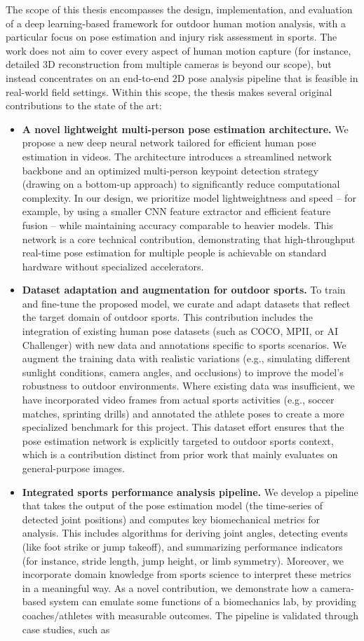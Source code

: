The scope of this thesis encompasses the design, implementation, and evaluation of a deep learning-based framework for outdoor human motion analysis, with a particular focus on pose estimation and injury risk assessment in sports. The work does not aim to cover every aspect of human motion capture (for instance, detailed 3D reconstruction from multiple cameras is beyond our scope), but instead concentrates on an end-to-end 2D pose analysis pipeline that is feasible in real-world field settings. Within this scope, the thesis makes several original contributions to the state of the art: \begin{itemize}
\item \textbf{A novel lightweight multi-person pose estimation architecture.} We propose a new deep neural network tailored for efficient human pose estimation in videos. The architecture introduces a streamlined network backbone and an optimized multi-person keypoint detection strategy (drawing on a bottom-up approach) to significantly reduce computational complexity. In our design, we prioritize model lightweightness and speed – for example, by using a smaller CNN feature extractor and efficient feature fusion – while maintaining accuracy comparable to heavier models. This network is a core technical contribution, demonstrating that high-throughput real-time pose estimation for multiple people is achievable on standard hardware without specialized accelerators. \item \textbf{Dataset adaptation and augmentation for outdoor sports.} To train and fine-tune the proposed model, we curate and adapt datasets that reflect the target domain of outdoor sports. This contribution includes the integration of existing human pose datasets (such as COCO, MPII, or AI Challenger) with new data and annotations specific to sports scenarios. We augment the training data with realistic variations (e.g., simulating different sunlight conditions, camera angles, and occlusions) to improve the model’s robustness to outdoor environments. Where existing data was insufficient, we have incorporated video frames from actual sports activities (e.g., soccer matches, sprinting drills) and annotated the athlete poses to create a more specialized benchmark for this project. This dataset effort ensures that the pose estimation network is explicitly targeted to outdoor sports context, which is a contribution distinct from prior work that mainly evaluates on general-purpose images. \item \textbf{Integrated sports performance analysis pipeline.} We develop a pipeline that takes the output of the pose estimation model (the time-series of detected joint positions) and computes key biomechanical metrics for analysis. This includes algorithms for deriving joint angles, detecting events (like foot strike or jump takeoff), and summarizing performance indicators (for instance, stride length, jump height, or limb symmetry). Moreover, we incorporate domain knowledge from sports science to interpret these metrics in a meaningful way. As a novel contribution, we demonstrate how a camera-based system can emulate some functions of a biomechanics lab, by providing coaches/athletes with measurable outcomes. The pipeline is validated through case studies, such as 
\end{itemize}
